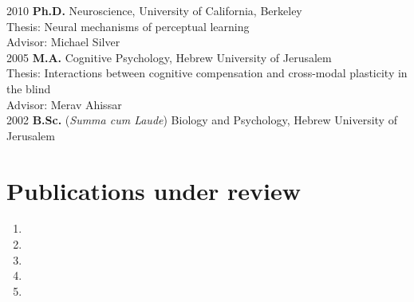 \documentclass[11pt,fullpage]{article}
\newcommand\tab[1][1cm]{\hspace*{#1}}
\begin{document}
	2010  {\bf Ph.D. } Neuroscience, University of California, Berkeley \\
     \tab Thesis: Neural mechanisms of perceptual learning\\
     \tab Advisor: Michael Silver \\
	2005  {\bf M.A.} Cognitive Psychology, Hebrew University of Jerusalem \\
      \tab Thesis: Interactions between cognitive compensation and cross-modal plasticity in the blind \\
      \tab Advisor: Merav Ahissar \\
	2002  {\bf B.Sc.} (\emph{Summa cum Laude}) Biology and Psychology, Hebrew University of Jerusalem \\


\section*{Publications under review}
\begin{enumerate}
\item {}
\item {}
\item {}
\item {}
\item {}
\end{enumerate}
\end{document}
